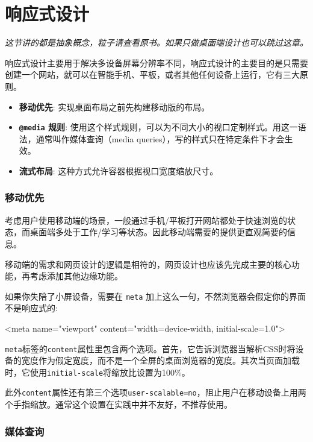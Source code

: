 \section{响应式设计}

\begin{center}
    \textit{这节讲的都是抽象概念，粒子请查看原书。如果只做桌面端设计也可以跳过这章。}
\end{center}

响应式设计主要用于解决多设备屏幕分辨率不同，响应式设计的主要目的是只需要创建一个网站，就可以在智能手机、平板，或者其他任何设备上运行，它有三大原则。

\begin{itemize}
    \item \textbf{移动优先}: 实现桌面布局之前先构建移动版的布局。
    \item \textbf{\texttt{@media} 规则}: 使用这个样式规则，可以为不同大小的视口定制样式。用这一语法，通常叫作媒体查询（media queries），写的样式只在特定条件下才会生效。
    \item \textbf{流式布局}: 这种方式允许容器根据视口宽度缩放尺寸。
\end{itemize}

\subsubsection*{移动优先}

考虑用户使用移动端的场景，一般通过手机/平板打开网站都处于快速浏览的状态，而桌面端多处于工作/学习等状态。因此移动端需要的提供更直观简要的信息。

移动端的需求和网页设计的逻辑是相符的，网页设计也应该先完成主要的核心功能，再考虑添加其他边缘功能。

如果你失陪了小屏设备，需要在 \texttt{meta} 加上这么一句，不然浏览器会假定你的界面不是响应式的:

\begin{HTML}
<meta name="viewport" content="width=device-width, initial-scale=1.0">
\end{HTML}

\texttt{meta}标签的\texttt{content}属性里包含两个选项。首先，它告诉浏览器当解析CSS时将设备的宽度作为假定宽度，而不是一个全屏的桌面浏览器的宽度。其次当页面加载时，它使用\texttt{initial-scale}将缩放比设置为100\%。

此外\texttt{content}属性还有第三个选项\texttt{user-scalable=no}，阻止用户在移动设备上用两个手指缩放。通常这个设置在实践中并不友好，不推荐使用。

\subsubsection*{媒体查询}

